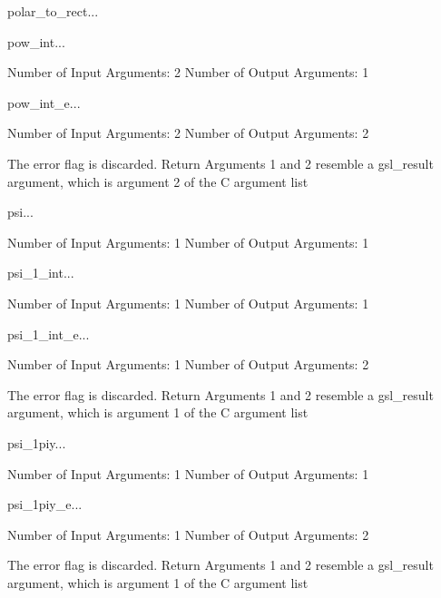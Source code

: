 \begin{funcdesc}{polar_to_rect}{...}

\end{funcdesc}

\begin{funcdesc}{pow_int}{...}

    Number of Input  Arguments:  2
    Number of Output Arguments:  1
\end{funcdesc}

\begin{funcdesc}{pow_int_e}{...}

    Number of Input  Arguments:  2
    Number of Output Arguments:  2

The error flag is discarded.
Return Arguments 1 and 2 resemble a gsl_result argument,
	which is  argument 2 of the C argument list

\end{funcdesc}

\begin{funcdesc}{psi}{...}

    Number of Input  Arguments:  1
    Number of Output Arguments:  1
\end{funcdesc}

\begin{funcdesc}{psi_1_int}{...}

    Number of Input  Arguments:  1
    Number of Output Arguments:  1
\end{funcdesc}

\begin{funcdesc}{psi_1_int_e}{...}

    Number of Input  Arguments:  1
    Number of Output Arguments:  2

The error flag is discarded.
Return Arguments 1 and 2 resemble a gsl_result argument,
	which is  argument 1 of the C argument list

\end{funcdesc}

\begin{funcdesc}{psi_1piy}{...}

    Number of Input  Arguments:  1
    Number of Output Arguments:  1
\end{funcdesc}

\begin{funcdesc}{psi_1piy_e}{...}

    Number of Input  Arguments:  1
    Number of Output Arguments:  2

The error flag is discarded.
Return Arguments 1 and 2 resemble a gsl_result argument,
	which is  argument 1 of the C argument list

\end{funcdesc}

